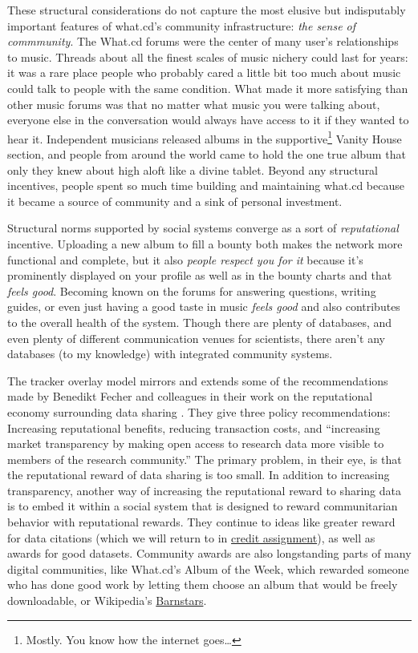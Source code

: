 \documentclass[10pt]{article}
\begin{document}
\begin{multicols}{2}
These structural considerations do not capture the most elusive but
indisputably important features of what.cd's community infrastructure:
\emph{the sense of commmunity}. The What.cd forums were the center of
many user's relationships to music. Threads about all the finest scales
of music nichery could last for years: it was a rare place people who
probably cared a little bit too much about music could talk to people
with the same condition. What made it more satisfying than other music
forums was that no matter what music you were talking about, everyone
else in the conversation would always have access to it if they wanted
to hear it. Independent musicians released albums in the
supportive\footnote{Mostly. You know how the internet goes\ldots{}}
Vanity House section, and people from around the world came to hold the
one true album that only they knew about high aloft like a divine
tablet. Beyond any structural incentives, people spent so much time
building and maintaining what.cd because it became a source of community
and a sink of personal investment.

Structural norms supported by social systems converge as a sort of
\emph{reputational} incentive. Uploading a new album to fill a bounty
both makes the network more functional and complete, but it also
\emph{people respect you for it} because it's prominently displayed on
your profile as well as in the bounty charts and that \emph{feels good}.
Becoming known on the forums for answering questions, writing guides, or
even just having a good taste in music \emph{feels good} and also
contributes to the overall health of the system. Though there are plenty
of databases, and even plenty of different communication venues for
scientists, there aren't any databases (to my knowledge) with integrated
community systems.

The tracker overlay model mirrors and extends some of the
recommendations made by Benedikt Fecher and colleagues in their work on
the reputational economy surrounding data sharing \cite{fecherReputationEconomyHow2017} . They give three policy
recommendations: Increasing reputational benefits, reducing transaction
costs, and ``increasing market transparency by making open access to
research data more visible to members of the research community.'' The
primary problem, in their eye, is that the reputational reward of data
sharing is too small. In addition to increasing transparency, another
way of increasing the reputational reward to sharing data is to embed it
within a social system that is designed to reward communitarian behavior
with reputational rewards. They continue to ideas like greater reward
for data citations (which we will return to in
\protect\hyperlink{credit-assignment}{credit assignment}), as well as
awards for good datasets. Community awards are also longstanding parts
of many digital communities, like What.cd's Album of the Week, which
rewarded someone who has done good work by letting them choose an album
that would be freely downloadable, or Wikipedia's
\href{https://en.wikipedia.org/wiki/Wikipedia:Barnstars}{Barnstars}.


\end{multicols}
\end{document}
